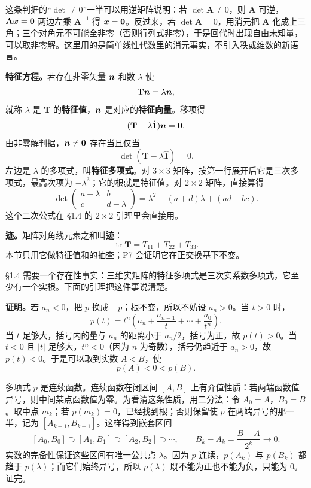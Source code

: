 \documentclass[11pt]{ctexart}
\newcommand{\ten}[1]{\mathbf{#1}}
\newcommand{\unitd}{\hat{\ten{1}}}
\newcommand{\tr}{\operatorname{tr}}
\let\origsubhdr\subhdr
\renewcommand{\subhdr}[1]{\par\needspace{3\baselineskip}\origsubhdr{#1}}
\begin{document}
这条判据的“$\det\ne0$”一半可以用逆矩阵说明：若 $\det\ten A\ne0$，则 $\ten A$ 可逆，$\ten A\vect x=\vect 0$ 两边左乘 $\ten A^{-1}$ 得 $\boldsymbol{x}=\boldsymbol{0}$。反过来，若 $\det\ten A=0$，用消元把 $\ten A$ 化成上三角；三个对角元不可能全非零（否则行列式非零），于是回代时出现自由未知量，可以取非零解。这里用的是简单线性代数里的消元事实，不引入秩或维数的新语言。

\textbf{特征方程。}若存在非零矢量 $\boldsymbol{n}$ 和数 $\lambda$ 使
\[
\ten T\vect n=\lambda\vect n,
\]
就称 $\lambda$ 是 $\ten T$ 的\textbf{特征值}，$\boldsymbol{n}$ 是对应的\textbf{特征向量}。移项得
\[
(\ten T-\lambda\unitd)\vect n=\vect 0 .
\]
由非零解判据，$\boldsymbol{n}\ne\boldsymbol{0}$ 存在当且仅当
\[
\det(\ten T-\lambda\unitd)=0 .
\]
左边是 $\lambda$ 的多项式，叫\textbf{特征多项式}。对 $3\times3$ 矩阵，按第一行展开后它是三次多项式，最高次项为 $-\lambda^3$；它的根就是特征值。对 $2\times2$ 矩阵，直接算得
\[
\det\begin{pmatrix}a-\lambda&b\\c&d-\lambda\end{pmatrix}
=\lambda^2-(a+d)\lambda+(ad-bc).
\]
这个二次公式在 §1.4 的 $2\times2$ 引理里会直接用。

\textbf{迹。}矩阵对角线元素之和叫\textbf{迹}：
\[
\tr\ten T=T_{11}+T_{22}+T_{33}.
\]
本节只用它做特征值和的抽查；P7 会证明它在正交换基下不变。


§1.4 需要一个存在性事实：三维实矩阵的特征多项式是三次实系数多项式，它至少有一个实根。下面的引理把这件事说清楚。

\begin{center}
\end{center}

\textbf{证明。}若 $a_n<0$，把 $p$ 换成 $-p$；根不变，所以不妨设 $a_n>0$。当 $t>0$ 时，
\[
p(t)=t^n\left(a_n+\frac{a_{n-1}}{t}+\cdots+\frac{a_0}{t^n}\right).
\]
当 $t$ 足够大，括号内的量与 $a_n$ 的距离小于 $a_n/2$，括号为正，故 $p(t)>0$。当 $t<0$ 且 $|t|$ 足够大，$t^n<0$（因为 $n$ 为奇数），括号仍趋近于 $a_n>0$，故 $p(t)<0$。于是可以取到实数 $A<B$，使
\[
p(A)<0<p(B).
\]

多项式 $p$ 是连续函数。连续函数在闭区间 $[A,B]$ 上有介值性质：若两端函数值异号，则中间某点函数值为零。为看清这条性质，用二分法：令 $A_0=A$，$B_0=B$。取中点 $m_k$；若 $p(m_k)=0$，已经找到根；否则保留使 $p$ 在两端异号的那一半，记为 $[A_{k+1},B_{k+1}]$。这样得到嵌套区间
\[
[A_0,B_0]\supset[A_1,B_1]\supset[A_2,B_2]\supset\cdots,
\qquad
B_k-A_k=\frac{B-A}{2^k}\to0 .
\]
实数的完备性保证这些区间有唯一公共点 $\lambda$。因为 $p$ 连续，$p(A_k)$ 与 $p(B_k)$ 都趋于 $p(\lambda)$；而它们始终异号，所以 $p(\lambda)$ 既不能为正也不能为负，只能为 $0$。证完。
\end{document}
